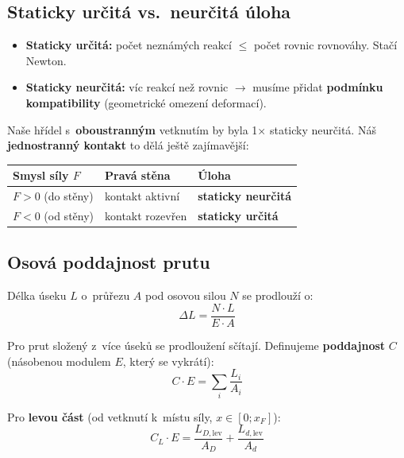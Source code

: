 \documentclass[a4paper,11pt]{article}
\begin{document}
\subsection{Staticky určitá vs.~neurčitá úloha}

\begin{itemize}[nosep]
    \item \textbf{Staticky určitá:} počet neznámých reakcí $\le$ počet rovnic rovnováhy. Stačí Newton.
    \item \textbf{Staticky neurčitá:} víc reakcí než rovnic $\to$ musíme přidat \textbf{podmínku kompatibility} (geometrické omezení deformací).
\end{itemize}

Naše hřídel s~\textbf{oboustranným} vetknutím by byla 1$\times$ staticky neurčitá. Náš \textbf{jednostranný kontakt} to dělá ještě zajímavější:

\begin{table}[H]
\centering
\begin{tabular}{lll}
\toprule
\textbf{Smysl síly $F$} & \textbf{Pravá stěna} & \textbf{Úloha} \\
\midrule
$F > 0$ (do stěny)  & kontakt aktivní  & \textbf{staticky neurčitá} \\
$F < 0$ (od stěny)  & kontakt rozevřen & \textbf{staticky určitá} \\
\bottomrule
\end{tabular}
\end{table}

\subsection{Osová poddajnost prutu}

Délka úseku $L$ o~průřezu $A$ pod osovou silou $N$ se prodlouží o:
\begin{equation}
\Delta L = \frac{N\cdot L}{E\cdot A}
\end{equation}

Pro prut složený z~více úseků se prodloužení sčítají. Definujeme \textbf{poddajnost} $C$ (násobenou modulem $E$, který se vykrátí):
\begin{equation}
C\cdot E = \sum_i \frac{L_i}{A_i}
\end{equation}

Pro \textbf{levou část} (od vetknutí k~místu síly, $x \in [0; x_F]$):
\begin{equation}
C_L\cdot E = \frac{L_{D,\mathrm{lev}}}{A_D} + \frac{L_{d,\mathrm{lev}}}{A_d}
\end{equation}
\end{document}
